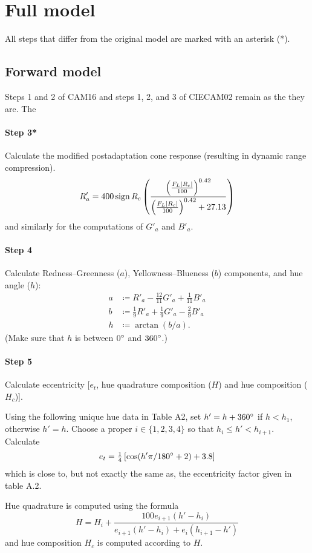 \documentclass[twocolumn]{scrartcl}
\DeclarePairedDelimiter\abs{\lvert}{\rvert}%
\DeclareMathOperator{\sign}{sign}
\begin{document}
\section{Full model}

All steps that differ from the original model are marked with an asterisk (*).

\subsection{Forward model}

Steps 1 and 2 of CAM16 and steps 1, 2, and 3 of CIECAM02 remain as the they are.
The

\paragraph{Step 3*}{%
Calculate the modified postadaptation cone response
(resulting in dynamic range compression).
\[
  R'_a = 400 \sign{R_c} \left(\frac{\left(\frac{F_L \abs{R_c}}{100}\right)^{0.42}}{\left(\frac{F_L \abs{R_c}}{100}\right)^{0.42} + 27.13}\right)
\]
and similarly for the computations of $G'_a$ and $B'_a$.
}

\paragraph{Step 4}{%
  Calculate Redness--Greenness ($a$), Yellowness--Blueness ($b$) components,
  and hue angle ($h$):
  \begin{align*}
    a&\coloneqq R'_a - \tfrac{12}{11} G'_a + \tfrac{1}{11} B'_a\\
    b&\coloneqq \tfrac{1}{9} R'_a + \tfrac{1}{9} G'_a - \tfrac{2}{9} B'_a\\
    h&\coloneqq \arctan(b/a).
  \end{align*}
  (Make sure that $h$ is between $0\degree$ and $360\degree$.)
}

\paragraph{Step 5}{%
  Calculate eccentricity [$e_t$, hue quadrature composition
($H$) and hue composition ($H_c$)].

Using the following unique hue data in Table A2, set
$h'= h + 360\degree$ if $h < h_1$, otherwise $h'=h$.
Choose a proper $i\in\{1,2,3,4\}$ so that $h_i\le h' < h_{i+1}$.
Calculate
\[
  e_t = \tfrac{1}{4}
  \left[
    \cos(h'\pi/180\degree + 2) + 3.8
  \right]
\]
which is close to, but not exactly the same as, the eccentricity factor given
in table A.2.

Hue quadrature is computed using the formula
\[
  H = H_i + \frac{100 e_{i+1} (h'-h_i)}{e_{i+1}(h'-h_i) + e_i (h_{i+1}-h')}
  \]
and hue composition $H_c$ is computed according to $H$. %
  }
\end{document}
